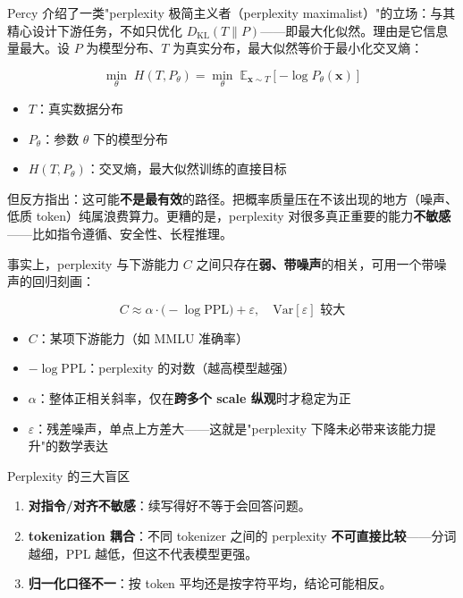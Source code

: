 \documentclass[a4paper]{article}
\begin{document}
Percy 介绍了一类"perplexity 极简主义者（perplexity maximalist）"的立场：与其精心设计下游任务，不如只优化 $D_{\mathrm{KL}}(T \| P)$——即最大化似然。理由是它信息量最大。设 $P$ 为模型分布、$T$ 为真实分布，最大似然等价于最小化交叉熵：

\[
\min_\theta \; H(T, P_\theta) = \min_\theta \; \mathbb{E}_{\mathbf{x} \sim T}\left[ -\log P_\theta(\mathbf{x}) \right]
\]

\begin{itemize}
\item $T$：真实数据分布
\item $P_\theta$：参数 $\theta$ 下的模型分布
\item $H(T, P_\theta)$：交叉熵，最大似然训练的直接目标
\end{itemize}

但反方指出：这可能\textbf{不是最有效}的路径。把概率质量压在不该出现的地方（噪声、低质 token）纯属浪费算力。更糟的是，perplexity 对很多真正重要的能力\textbf{不敏感}——比如指令遵循、安全性、长程推理。

事实上，perplexity 与下游能力 $C$ 之间只存在\textbf{弱、带噪声}的相关，可用一个带噪声的回归刻画：

\[
C \approx \alpha \cdot \big(-\log \mathrm{PPL}\big) + \varepsilon, \quad \mathrm{Var}[\varepsilon] \text{ 较大}
\]

\begin{itemize}
\item $C$：某项下游能力（如 MMLU 准确率）
\item $-\log \mathrm{PPL}$：perplexity 的对数（越高模型越强）
\item $\alpha$：整体正相关斜率，仅在\textbf{跨多个 scale 纵观}时才稳定为正
\item $\varepsilon$：残差噪声，单点上方差大——这就是"perplexity 下降未必带来该能力提升"的数学表达
\end{itemize}

\begin{warningbox}{Perplexity 的三大盲区}
\begin{enumerate}
\item \textbf{对指令/对齐不敏感}：续写得好不等于会回答问题。
\item \textbf{tokenization 耦合}：不同 tokenizer 之间的 perplexity \textbf{不可直接比较}——分词越细，PPL 越低，但这不代表模型更强。
\item \textbf{归一化口径不一}：按 token 平均还是按字符平均，结论可能相反。
\end{enumerate}
\end{warningbox}
\end{document}
